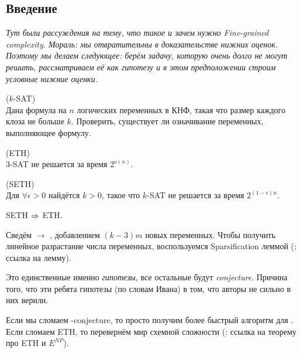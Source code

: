 
\subsection{Введение}

\textit{Тут были рассуждения на тему, что такое и зачем нужно Fine-grained complexity. Мораль: мы отвратительны в доказательстве нижних оценок. Поэтому мы делаем следующее: берём задачу, которую очень долго не могут решить, рассматриваем её как гипотезу и в этом предположении строим условные нижние оценки.}

\begin{problem}($k$-SAT)\\
   Дана формула на $n$ логических переменных в КНФ, такая что размер каждого клоза не больше $k$. Проверить, существует ли означивание переменных, выполняющее формулу.
\end{problem}

\begin{hypothesis}(ETH)~\cite{Impagliazzo2001}\\
   $3$-SAT не решается за время $2^{o(n)}$.
\end{hypothesis}

\begin{hypothesis}(SETH)~\cite{Impagliazzo2001}\\
   Для $\forall \epsilon > 0$ найдётся $k > 0$, такое что $k$-SAT не решается за время $2^{(1-\epsilon)n}$.
\end{hypothesis}

\begin{statement}
    SETH $\Rightarrow$ ETH.
\end{statement}

\begin{proof1}
    Сведём  $\to$ , добавлением $(k - 3) m$ новых переменных. Чтобы получить линейное разрастание числа переменных, воспользуемся Sparsification леммой (\TODO: ссылка на лемму).
\end{proof1}

\begin{remark}
    Это единственные именно \textit{гипотезы}, все остальные будут \textit{conjecture}. Причина того, что эти ребята гипотезы (по словам Ивана) в том, что авторы не сильно в них верили.
\end{remark}

\begin{remark}
    Если мы сломаем -conjecture, то просто получим более быстрый алгоритм для . Если сломаем ETH, то перевернём мир схемной сложности (\TODO: ссылка на теорему про ETH и $E^{NP}$).
\end{remark}

